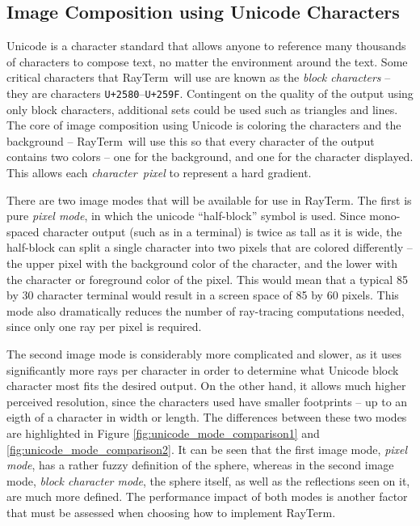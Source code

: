 \documentclass[11pt]{article}
\newcommand{\name}{{\sc RayTerm}}
\begin{document}
\subsection{Image Composition using Unicode Characters}
\label{sec:introduction:unicode}

Unicode is a character standard that allows anyone to reference many thousands of characters to compose text, no matter the environment around the text. Some critical characters that \name\ will use are known as the {\it block characters} -- they are characters \texttt{U+2580}--\texttt{U+259F}. Contingent on the quality of the output using only block characters, additional sets could be used such as triangles and lines. The core of image composition using Unicode is coloring the characters and the background -- \name\ will use this so that every character of the output contains two colors -- one for the background, and one for the character displayed. This allows each {\it character~pixel} to represent a hard gradient.

There are two image modes that will be available for use in \name. The first is pure {\it pixel mode}, in which the unicode ``half-block'' symbol is used. Since mono-spaced character output (such as in a terminal) is twice as tall as it is wide, the half-block can split a single character into two pixels that are colored differently -- the upper pixel with the background color of the character, and the lower with the character or foreground color of the pixel. This would mean that a typical 85 by 30 character terminal would result in a screen space of 85 by 60 pixels. This mode also dramatically reduces the number of ray-tracing computations needed, since only one ray per pixel is required.

The second image mode is considerably more complicated and slower, as it uses significantly more rays per character in order to determine what Unicode block character most fits the desired output. On the other hand, it allows much higher perceived resolution, since the characters used have smaller footprints -- up to an eigth of a character in width or length. The differences between these two modes are highlighted in Figure \ref{fig:unicode_mode_comparison1} and \ref{fig:unicode_mode_comparison2}. It can be seen that the first image mode, {\it pixel mode}, has a rather fuzzy definition of the sphere, whereas in the second image mode, {\it block character mode}, the sphere itself, as well as the reflections seen on it, are much more defined. The performance impact of both modes is another factor that must be assessed when choosing how to implement \name.
\end{document}
